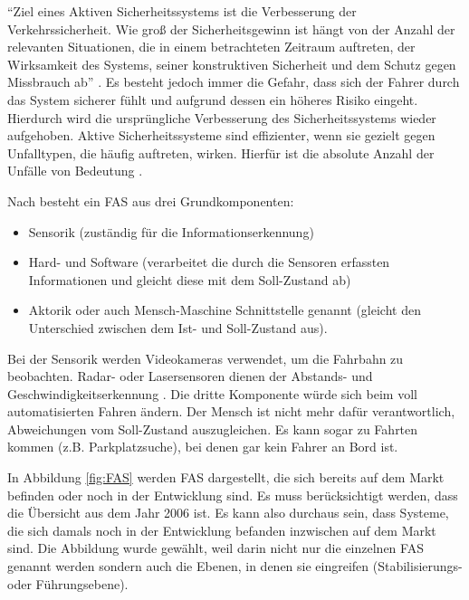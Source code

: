 \enquote{Ziel eines Aktiven Sicherheitssystems ist die Verbesserung der Verkehrssicherheit. Wie groß der Sicherheitsgewinn ist hängt von der Anzahl der relevanten Situationen, die in einem betrachteten Zeitraum auftreten, der Wirksamkeit des Systems, seiner konstruktiven Sicherheit und dem Schutz gegen Missbrauch ab} \parencite[S. 10]{Meitinger.2008}. Es besteht jedoch immer die Gefahr, dass sich der Fahrer durch das System sicherer fühlt und aufgrund dessen ein höheres Risiko eingeht. Hierdurch wird die ursprüngliche Verbesserung des Sicherheitssystems wieder aufgehoben. Aktive Sicherheitssysteme sind effizienter, wenn sie gezielt gegen Unfalltypen, die häufig auftreten, wirken. Hierfür ist die absolute Anzahl der Unfälle von Bedeutung \parencite[S. 19]{Meitinger.2008}.

Nach \Textcite[S. 10]{Blakaj.14.09.2016} besteht ein \ac{FAS} aus drei Grundkomponenten:

\begin{itemize}
	\item Sensorik (zuständig für die Informationserkennung)
	\item Hard- und Software (verarbeitet die durch die Sensoren erfassten Informationen und gleicht diese mit dem Soll-Zustand ab)
	\item Aktorik oder auch Mensch-Maschine Schnittstelle genannt (gleicht den Unterschied zwischen dem Ist- und Soll-Zustand aus).
\end{itemize}

Bei der Sensorik werden Videokameras verwendet, um die Fahrbahn zu beobachten. Radar- oder Lasersensoren dienen der Abstands- und Geschwindigkeitserkennung \parencite[S. 4f]{Schmidt.2010}. Die dritte Komponente würde sich beim voll automatisierten Fahren ändern. Der Mensch ist nicht mehr dafür verantwortlich, Abweichungen vom Soll-Zustand auszugleichen. Es kann sogar zu Fahrten kommen (z.B. Parkplatzsuche), bei denen gar kein Fahrer an Bord ist.

In Abbildung \ref{fig:FAS} werden \ac{FAS} dargestellt, die sich bereits auf dem Markt befinden oder noch in der Entwicklung sind. Es muss berücksichtigt werden, dass die Übersicht aus dem Jahr 2006 ist. Es kann also durchaus sein, dass Systeme, die sich damals noch in der Entwicklung befanden inzwischen auf dem Markt sind. Die Abbildung wurde gewählt, weil darin nicht nur die einzelnen \ac{FAS} genannt werden sondern auch die Ebenen, in denen sie eingreifen (Stabilisierungs- oder Führungsebene).

